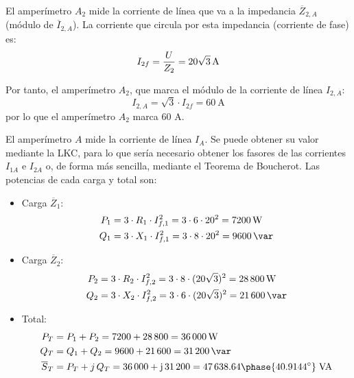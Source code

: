 \vspace{3mm}
El amperímetro $A_2$ mide la corriente de línea que va a la impedancia $\overline{Z}_{2,A}$ (módulo de $\overline{I}_{2,A}$). La corriente que circula por esta impedancia (corriente de fase) es:
\begin{equation*}
    I_{2f} = \frac{U}{Z_2} = \qty[parse-numbers = false]{20\sqrt{3}}{\ampere}
\end{equation*}

Por tanto, el amperímetro $A_2$, que marca el módulo de la corriente de línea $I_{2,A}$: 
\begin{equation*}
    I_{2,A}= \sqrt{3}\cdot I_{2f} = \qty{60}{\ampere}
\end{equation*}
por lo que el amperímetro $A_2$ marca 60 A.

\vspace{3mm}
El amperímetro $A$ mide la corriente de línea $I_A$. Se puede obtener su valor mediante la LKC, para lo que sería necesario obtener los fasores de las corrientes $I_{1A}$ e $I_{2A}$ o, de forma más sencilla, mediante el Teorema de Boucherot. Las potencias de cada carga y total son:

\begin{itemize}
    \item Carga $\overline{Z}_1$:
    \begin{align*}
        P_1&=3\cdot R_1\cdot I_{f,1}^2=3\cdot 6\cdot 20^2=\qty{7200}{\watt}\\
        Q_1&=3\cdot X_1\cdot I_{f,1}^2=3\cdot 8\cdot 20^2=\qty{9600}{\var}
    \end{align*}
    \item Carga $\overline{Z}_2$:
    \begin{align*}
        P_2&=3\cdot R_2\cdot I_{f,2}^2=3\cdot 8\cdot (20\sqrt{3})^2=\qty{28800}{\watt}\\
        Q_2&=3\cdot X_2\cdot I_{f,2}^2=3\cdot 6\cdot (20\sqrt{3})^2=\qty{21600}{\var}
    \end{align*}
    \item Total:
    \begin{align*}
        P_T&=P_1+P_2=7200+28\,800=\qty{36000}{\watt}\\
        Q_T&=Q_1+Q_2=9600+21\,600=\qty{31200}{\var}\\
        \overline{S}_T&=P_T+j\,Q_T={36\,000+\mathrm{j}\,31\,200 = 47\,638.64\phase{40.9144^\circ} \;\text{VA}}
    \end{align*}
\end{itemize}

